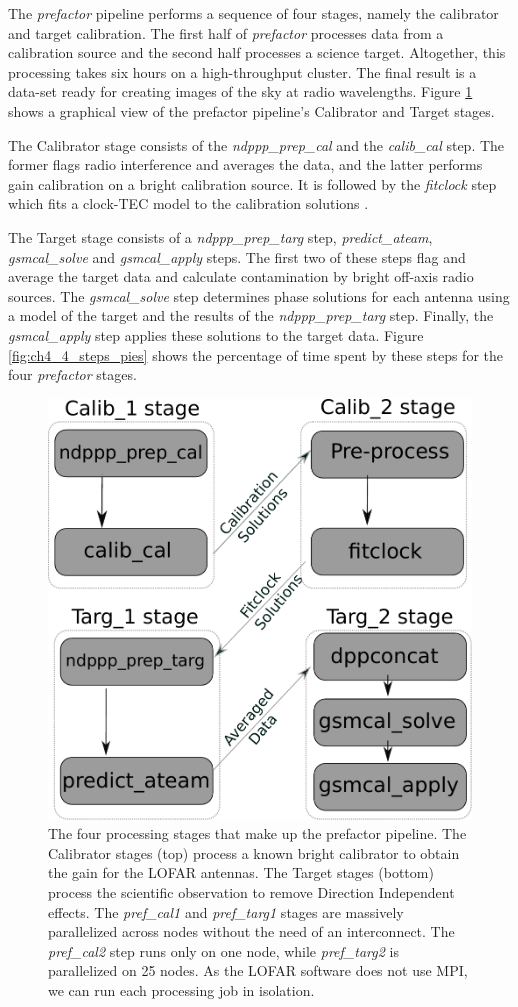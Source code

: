 The \textit{prefactor} pipeline performs a sequence of four stages, namely the calibrator and target calibration. The first half of \textit{prefactor} processes data from a calibration source and the second half processes a science target. Altogether, this processing takes six hours on a high-throughput cluster. The final result is a data-set ready for creating  images of the sky at radio wavelengths. Figure \ref{fig:ch4_four_steps_box} shows a graphical view of the prefactor pipeline's Calibrator and Target stages.


The Calibrator stage consists of the \textit{ndppp\_prep\_cal} and the \textit{calib\_cal} step. The former flags radio interference and averages the data, and the latter performs gain calibration on a bright calibration source. It is followed by the \textit{fitclock} step which fits a clock-TEC model to the calibration solutions \citep{vanweeren2016}.  

The Target stage consists of a \textit{ndppp\_prep\_targ} step, \textit{predict\_ateam}, \textit{gsmcal\_solve} and \textit{gsmcal\_apply} steps. The first two of these steps flag and average the target data and calculate contamination by bright off-axis radio sources. The \textit{gsmcal\_solve} step determines phase solutions for each antenna using a model of the target and the results of the \textit{ndppp\_prep\_targ} step. Finally, the \textit{gsmcal\_apply} step applies these solutions to the target data. Figure \ref{fig:ch4_4_steps_pies} shows the percentage of time spent by these steps for the four \textit{prefactor} stages.

\begin{figure}[H]
    \centering
    \includegraphics[width=0.5\linewidth]{ch4/figures/fig1/fig1.pdf}
      \caption[The four processing stages that make up the prefactor pipeline.]{The four processing stages that make up the prefactor pipeline. The Calibrator stages (top) process a known bright calibrator to obtain the gain for the LOFAR antennas. The Target stages (bottom) process the scientific observation to remove Direction Independent effects. The \textit{pref\_cal1} and \textit{pref\_targ1} stages are massively parallelized across nodes without the need of an interconnect. The \textit{pref\_cal2} step runs only on one node, while \textit{pref\_targ2} is parallelized on 25 nodes. As the LOFAR software does not use MPI, we can run each processing job in isolation. }
	\label{fig:ch4_four_steps_box}
\end{figure}

